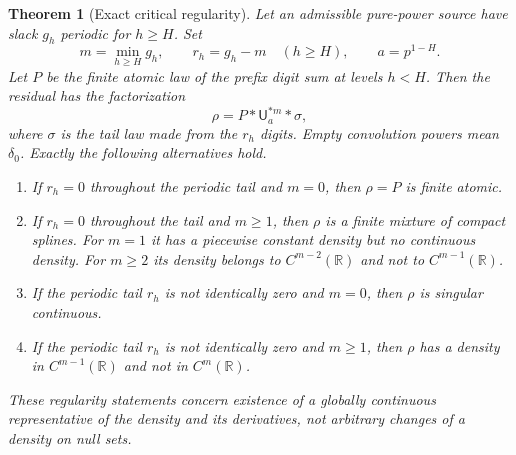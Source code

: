\documentclass[11pt,a4paper]{article}
\newtheorem{theorem}{Theorem}[section]
\theoremstyle{remark}
\newcommand{\R}{\mathbb R}
\newcommand{\Unif}{\mathsf U}
\begin{document}
\begin{theorem}[Exact critical regularity]
\label{thm:critical}
Let an admissible pure-power source have slack $g_h$ periodic for $h\ge H$.
Set
\[
 m=\min_{h\ge H}g_h,\qquad r_h=g_h-m\quad(h\ge H),\qquad a=p^{1-H}.
\]
Let $P$ be the finite atomic law of the prefix digit sum at levels $h<H$.
Then the residual has the factorization
\begin{equation}
 \rho=P*\Unif_a^{*m}*\sigma,
 \label{eq:critical-decomposition}
\end{equation}
where $\sigma$ is the tail law made from the $r_h$ digits. Empty convolution
powers mean $\delta_0$. Exactly the following alternatives hold.
\begin{enumerate}[label=\textup{(\roman*)}]
\item If $r_h=0$ throughout the periodic tail and $m=0$, then $\rho=P$ is
finite atomic.
\item If $r_h=0$ throughout the tail and $m\ge1$, then $\rho$ is a finite
mixture of compact splines. For $m=1$ it has a piecewise constant density but
no continuous density. For $m\ge2$ its density belongs to $C^{m-2}(\R)$ and
not to $C^{m-1}(\R)$.
\item If the periodic tail $r_h$ is not identically zero and $m=0$, then
$\rho$ is singular continuous.
\item If the periodic tail $r_h$ is not identically zero and $m\ge1$, then
$\rho$ has a density in $C^{m-1}(\R)$ and not in $C^m(\R)$.
\end{enumerate}
These regularity statements concern existence of a globally continuous
representative of the density and its derivatives, not arbitrary changes of
a density on null sets.
\end{theorem}
\end{document}
